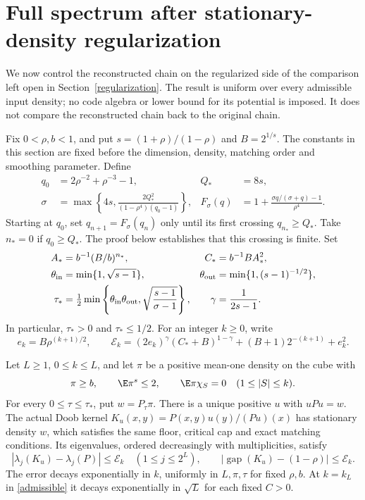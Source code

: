 \section{Full spectrum after stationary-density regularization}\label{densityspectrum}
We now control the reconstructed chain on the regularized side of the
comparison left open in Section~\ref{regularization}. The result is uniform
over every admissible input density; no code algebra or lower bound for its
potential is imposed. It does not compare the reconstructed chain back to
the original chain.

Fix $0<\rho,b<1$, and put $s=(1+\rho)/(1-\rho)$ and $B=2^{1/s}$.
The constants in this section are fixed before the dimension, density,
matching order and smoothing parameter. Define
\begin{align*}
 q_0&=2\rho^{-2}+\rho^{-3}-1,& Q_*&=8s,\\
 \sigma&=\max\left\{4s,\frac{2Q_*^2}{(1-\rho^4)(q_0-1)}\right\},&
 F_\sigma(q)&=1+\frac{\sigma q/(\sigma+q)-1}{\rho^4}.
\end{align*}
Starting at $q_0$, set $q_{n+1}=F_\sigma(q_n)$ only until its first
crossing $q_{n_*}\geq Q_*$. Take $n_*=0$ if $q_0\geq Q_*$.
The proof below establishes that this crossing is finite. Set
\begin{align*}
 A_*&=b^{-1}(B/b)^{n_*},& C_*&=b^{-1}BA_*^2,\\
 \theta_{\rm in}&=\min\{1,\sqrt{s-1}\},&
 \theta_{\rm out}&=\min\{1,(s-1)^{-1/2}\},\\
 \tau_*&=\tfrac12\min\left\{\theta_{\rm in}\theta_{\rm out},
                    \sqrt{\frac{s-1}{\sigma-1}}\right\},&
 \gamma&=\frac1{2s-1}.
\end{align*}
In particular, $\tau_*>0$ and $\tau_*\leq1/2$. For an integer $k\geq0$,
write
\begin{equation}\label{densityspectrumerror}
 e_k=B\rho^{(k+1)/2},\qquad
 \mathcal E_k=(2e_k)^\gamma(C_*+B)^{1-\gamma}
                 +(B+1)2^{-(k+1)}+e_k^2.
\end{equation}

\begin{theorem}\label{densityspectrumtheorem}
Let $L\geq1$, $0\leq k\leq L$, and let $\pi$ be a positive mean-one
density on the cube with
\[
 \pi\geq b,\qquad \E\pi^s\leq2,\qquad
 \E\pi\chi_S=0\quad(1\leq |S|\leq k).
\]
For every $0\leq\tau\leq\tau_*$, put $w=P_\tau\pi$.
There is a unique positive $u$ with $uPu=w$. The actual Doob kernel
$K_u(x,y)=P(x,y)u(y)/(Pu)(x)$ has stationary density $w$, which satisfies
the same floor, critical cap and exact matching conditions. Its eigenvalues,
ordered decreasingly with multiplicities, satisfy
\[
 |\lambda_j(K_u)-\lambda_j(P)|\leq\mathcal E_k
       \quad(1\leq j\leq2^L),\qquad
 |\operatorname{gap}(K_u)-(1-\rho)|\leq\mathcal E_k.
\]
The error decays exponentially in $k$, uniformly in $L,\pi,\tau$ for
fixed $\rho,b$. At $k=k_L$ in \eqref{admissible} it decays exponentially
in $\sqrt L$ for each fixed $C>0$.
\end{theorem}


